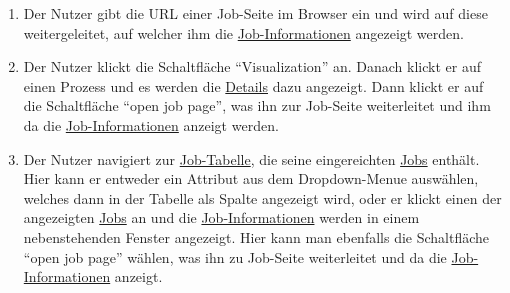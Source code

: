 \begin{enumerate}
   

\item Der \gls{Nutzer} gibt die URL einer Job-Seite im Browser ein und wird auf diese weitergeleitet, auf welcher ihm die \hyperref[B:Job-Informationen]{Job-Informationen} angezeigt werden.

\item Der \gls{Nutzer} klickt die Schaltfläche \enquote{Visualization} an. Danach klickt er auf einen Prozess und es werden die \hyperref[B:Job-Details]{Details} dazu angezeigt. Dann klickt er auf die Schaltfläche \enquote{open job page}, was ihn zur Job-Seite weiterleitet und ihm da die \hyperref[B:Job-Informationen]{Job-Informationen} anzeigt werden.

\item Der \gls{Nutzer} navigiert zur \hyperref[pages:job-table]{Job-Tabelle}, die seine eingereichten \hyperref[B:Jobs]{Jobs} enthält. Hier kann er entweder ein Attribut aus dem \gls{Dropdown-Menue} auswählen, welches dann in der Tabelle als Spalte angezeigt wird, oder er klickt einen der angezeigten \hyperref[B:Jobs]{Jobs} an und die \hyperref[B:Job-Informationen]{Job-Informationen} werden in einem nebenstehenden Fenster angezeigt. Hier kann man ebenfalls die Schaltfläche \enquote{open job page} wählen, was ihn zu Job-Seite weiterleitet und da die \hyperref[B:Job-Informationen]{Job-Informationen} anzeigt.
\end{enumerate}